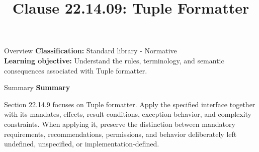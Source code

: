 \documentclass[10pt,letterpaper]{article}
\title{Clause 22.14.09: Tuple Formatter}
\author{}
\date{}
\begin{document}
\maketitle
\begin{CornellOverviewBox}{Overview}
\textbf{Classification:} Standard library - Normative\\[2pt]
\textbf{Learning objective:} Understand the rules, terminology, and semantic consequences associated with Tuple formatter.
\end{CornellOverviewBox}\begin{CornellSummaryBox}{Summary}
{\sffamily\bfseries\color{Accent} Summary}\par\vspace{3pt}Section 22.14.9 focuses on Tuple formatter. Apply the specified interface together with its mandates, effects, result conditions, exception behavior, and complexity constraints. When applying it, preserve the distinction between mandatory requirements, recommendations, permissions, and behavior deliberately left undefined, unspecified, or implementation-defined.
\end{CornellSummaryBox}
\end{document}
